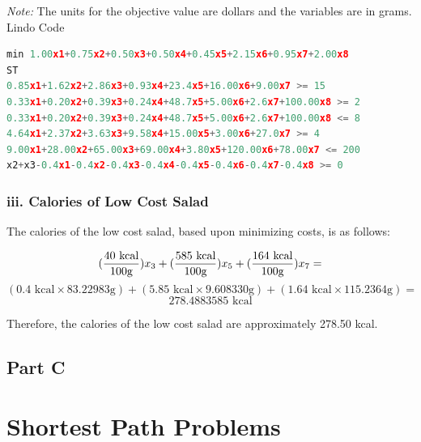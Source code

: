 \documentclass[11pt]{scrreprt}
\begin{document}
{\it Note:} The units for the objective value are dollars and  the variables are in grams.\\

\pagebreak
Lindo Code
\begin{lstlisting}[basicstyle=\small,language=c]
min 1.00x1+0.75x2+0.50x3+0.50x4+0.45x5+2.15x6+0.95x7+2.00x8
ST
0.85x1+1.62x2+2.86x3+0.93x4+23.4x5+16.00x6+9.00x7 >= 15
0.33x1+0.20x2+0.39x3+0.24x4+48.7x5+5.00x6+2.6x7+100.00x8 >= 2
0.33x1+0.20x2+0.39x3+0.24x4+48.7x5+5.00x6+2.6x7+100.00x8 <= 8
4.64x1+2.37x2+3.63x3+9.58x4+15.00x5+3.00x6+27.0x7 >= 4
9.00x1+28.00x2+65.00x3+69.00x4+3.80x5+120.00x6+78.00x7 <= 200
x2+x3-0.4x1-0.4x2-0.4x3-0.4x4-0.4x5-0.4x6-0.4x7-0.4x8 >= 0
\end{lstlisting}

\subsection{iii. Calories of Low Cost Salad}

The calories of the low cost salad, based upon minimizing costs, is as follows:

\begin{displaymath}
({40\text{ kcal} \over 100\text{g}})x_3 + ({585\text{ kcal} \over 100\text{g}})x_5 + ({164\text{ kcal} \over 100\text{g}})x_7 =
\end{displaymath}
\begin{displaymath}
(0.4\text{ kcal} \times 83.22983\text{g}) + (5.85\text{ kcal} \times 9.608330\text{g}) + (1.64\text{ kcal} \times 115.2364\text{g}) =
\end{displaymath}
\begin{displaymath}
278.4883585\text{ kcal}
\end{displaymath}

Therefore, the calories of the low cost salad are approximately 278.50 kcal.

\section{Part C}

\chapter{Shortest Path Problems}
\end{document}
